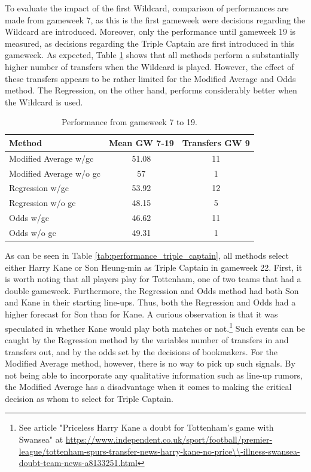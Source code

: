 To evaluate the impact of the first Wildcard,  comparison of performances are made from gameweek 7, as this is the first gameweek were decisions regarding the Wildcard are introduced. Moreover, only the performance until gameweek 19 is measured, as decisions regarding the Triple Captain are first introduced in this gameweek. As expected, Table \ref{tab:first_wildcard} shows that all methods perform a substantially higher number of transfers when the Wildcard is played. However, the effect of these transfers appears to be rather limited for the Modified Average and Odds method. The Regression, on the other hand, performs considerably better when the Wildcard is used. 

\newpar




\begin{table}[H]
\centering
\begin{tabular}{@{}lcc@{}}
\toprule
                Method  & Mean GW 7-19  & Transfers GW 9 \\ \midrule
Modified Average w/gc   & 51.08 & 11             \\
Modified Average w/o gc & 57    & 1              \\
Regression w/gc         & 53.92 & 12             \\
Regression w/o gc       & 48.15 & 5              \\
Odds w/gc               & 46.62 & 11             \\
Odds w/o gc             & 49.31 & 1              \\ \bottomrule
\end{tabular}
\caption{Performance from gameweek 7 to 19.}
\label{tab:first_wildcard}
\end{table}


As can be seen in Table \ref{tab:performance_triple_captain}, all methods select either Harry Kane or Son Heung-min as Triple Captain in gameweek 22. First, it is worth noting that all players play for Tottenham, one of two teams that had a double gameweek. Furthermore, the Regression and Odds method had both Son and Kane in their starting line-ups. Thus, both the Regression and Odds had a higher forecast for Son than for Kane. A curious observation is that it was speculated in whether Kane would play both matches or not.\footnote{See article "Priceless Harry Kane a doubt for Tottenham's game with Swansea" at \newline \url{https://www.independent.co.uk/sport/football/premier-league/tottenham-spurs-transfer-news-harry-kane-no-price\\-illness-swansea-doubt-team-news-a8133251.html}} Such events can be caught by the Regression method by the variables number of transfers in and transfers out, and by the odds set by the decisions of bookmakers. For the Modified Average method, however, there is no way to pick up such signals. By not being able to incorporate any qualitative information such as line-up rumors, the Modified Average has a disadvantage when it comes to making the critical decision as whom to select for Triple Captain.

